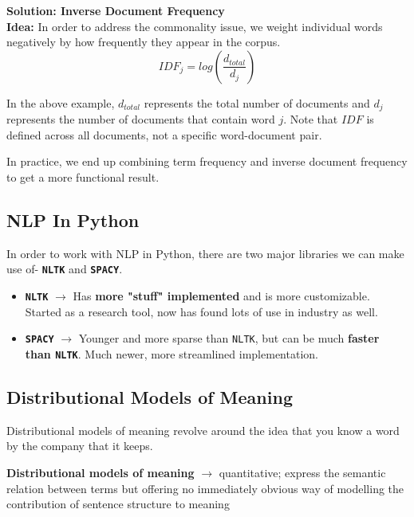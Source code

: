 \documentclass[english, 10pt]{article}
\begin{document}
\begin{myproof}
\textbf{Solution: Inverse Document Frequency}\\

\textbf{Idea:} In order to address the commonality issue, we weight individual words negatively by how frequently they appear in the corpus.\\

$$IDF_j= log(\frac{d_{total}}{d_j})$$

In the above example, $d_{total}$ represents the total number of documents and $d_j$ represents the number of documents that contain word $j$. Note that $IDF$ is defined across all documents, not a specific word-document pair.
\end{myproof}

\hfill \break In practice, we end up combining term frequency and inverse document frequency to get a more functional result.

\subsection{NLP In Python}

In order to work with NLP in Python, there are two major libraries we can make use of- \textbf{\texttt{NLTK}} and \textbf{\texttt{SPACY}}.\\

\begin{itemize}
	\item \textbf{\texttt{NLTK}} $\rightarrow$ Has \textbf{more "stuff" implemented} and is more customizable. Started as a research tool, now has found lots of use in industry as well.
	\item \textbf{\texttt{SPACY}} $\rightarrow$ Younger and more sparse than \texttt{NLTK}, but can be much \textbf{faster than \texttt{NLTK}}. Much newer, more streamlined implementation.
\end{itemize}

\subsection{Distributional Models of Meaning}

Distributional models of meaning revolve around the idea that you know a word by the company that it keeps. \\

\begin{tcolorbox}[title=Definition:,colframe=red!75!black,colback=red!5!white,arc=0pt,fonttitle=\bfseries]
\textbf{Distributional models of meaning} $\rightarrow$ quantitative; express the semantic relation between terms but offering no immediately obvious way of modelling the contribution of sentence structure to meaning
\end{tcolorbox}
\end{document}
